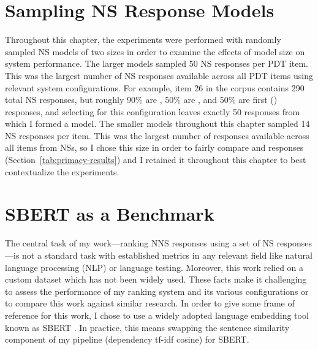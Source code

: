 

\section{Sampling NS Response Models}
\label{sec:sampling}

Throughout this chapter, the experiments were performed with randomly sampled NS models of two sizes in order to examine the effects of model size on system performance. The larger models sampled 50 NS responses per PDT item. This was the largest number of NS responses available across all PDT items using relevant system configurations. For example, item 26 in the corpus contains 290 total NS responses, but roughly 90\% are , 50\% are , and 50\% are first () responses, and selecting for this configuration leaves exactly 50 responses from which I formed a model. The smaller models throughout this chapter sampled 14 NS responses per item. This was the largest number of responses available across all items from  NSs, so I chose this size in order to fairly compare  and  responses (Section~\ref{tab:primacy-results}) and I retained it throughout this chapter to best contextualize the  experiments.

\section{SBERT as a Benchmark}
\label{sec:bert-benchmark}
The central task of my work---ranking NNS responses using a set of NS responses---is not a standard task with established metrics in any relevant field like natural language processing (NLP) or language testing. Moreover, this work relied on a custom dataset which has not been widely used. These facts make it challenging to assess the performance of my ranking system and its various configurations or to compare this work against similar research. In order to give some frame of reference for this work, I chose to use a widely adopted language embedding tool known as SBERT \cite{sbert2020}. In practice, this means swapping the sentence similarity component of my pipeline (dependency tf-idf cosine) for SBERT.

